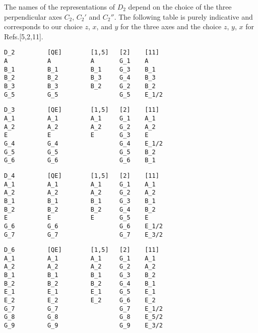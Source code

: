 \documentclass[12pt,a4paper,twoside]{report}
\begin{document}
The names of the representations of $D_2$ depend on the choice of the 
three perpendicular axes $C_2$, $C_2'$ and $C_2''$. The following table 
is purely indicative and corresponds to our choice $z$, $x$, and $y$ 
for the three axes and the choice $z$, $y$, $x$ for Refs.[5,2,11].

\begin{tcolorbox}
\begin{footnotesize}
\begin{verbatim}
D_2         [QE]        [1,5]   [2]    [11] 
A           A           A       G_1    A
B_1         B_1         B_1     G_3    B_1
B_2         B_2         B_3     G_4    B_3
B_3         B_3         B_2     G_2    B_2
G_5         G_5                 G_5    E_1/2
\end{verbatim}
\end{footnotesize}
\end{tcolorbox}

\begin{tcolorbox}
\begin{footnotesize}
\begin{verbatim}
D_3         [QE]        [1,5]   [2]    [11]  
A_1         A_1         A_1     G_1    A_1
A_2         A_2         A_2     G_2    A_2
E           E           E       G_3    E
G_4         G_4                 G_4    E_1/2
G_5         G_5                 G_5    B_2
G_6         G_6                 G_6    B_1
\end{verbatim}
\end{footnotesize}
\end{tcolorbox}

\begin{tcolorbox}
\begin{footnotesize}
\begin{verbatim}
D_4         [QE]        [1,5]   [2]    [11] 
A_1         A_1         A_1     G_1    A_1
A_2         A_2         A_2     G_2    A_2
B_1         B_1         B_1     G_3    B_1
B_2         B_2         B_2     G_4    B_2
E           E           E       G_5    E
G_6         G_6                 G_6    E_1/2
G_7         G_7                 G_7    E_3/2
\end{verbatim}
\end{footnotesize}
\end{tcolorbox}

\begin{tcolorbox}
\begin{footnotesize}
\begin{verbatim}
D_6         [QE]        [1,5]   [2]    [11]
A_1         A_1         A_1     G_1    A_1
A_2         A_2         A_2     G_2    A_2
B_1         B_1         B_1     G_3    B_2               
B_2         B_2         B_2     G_4    B_1
E_1         E_1         E_1     G_5    E_1
E_2         E_2         E_2     G_6    E_2
G_7         G_7                 G_7    E_1/2
G_8         G_8                 G_8    E_5/2 
G_9         G_9                 G_9    E_3/2  
\end{verbatim}
\end{footnotesize}
\end{tcolorbox}
\end{document}
